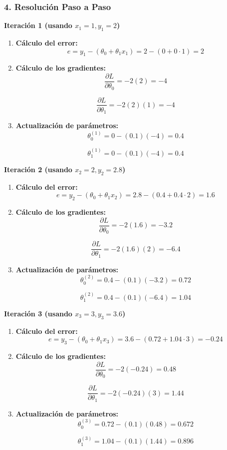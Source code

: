 \documentclass[a5paper]{article}
\begin{document}
	\subsubsection*{4. Resolución Paso a Paso}
	
	\textbf{Iteración 1 (usando \( x_1 = 1, y_1 = 2 \))}
	
	\begin{enumerate}
		\item \textbf{Cálculo del error:}
		\[
		e = y_1 - (\theta_0 + \theta_1 x_1) = 2 - (0 + 0 \cdot 1) = 2
		\]
		
		\item \textbf{Cálculo de los gradientes:}
		\[
		\frac{\partial L}{\partial \theta_0} = -2 (2) = -4
		\]
		
		\[
		\frac{\partial L}{\partial \theta_1} = -2 (2) (1) = -4
		\]
		
		\item \textbf{Actualización de parámetros:}
		\[
		\theta_0^{(1)} = 0 - (0.1)(-4) = 0.4
		\]
		
		\[
		\theta_1^{(1)} = 0 - (0.1)(-4) = 0.4
		\]
	\end{enumerate}
	
	\textbf{Iteración 2 (usando \( x_2 = 2, y_2 = 2.8 \))}
	
	\begin{enumerate}
		\item \textbf{Cálculo del error:}
		\[
		e = y_2 - (\theta_0 + \theta_1 x_2) = 2.8 - (0.4 + 0.4 \cdot 2) = 1.6
		\]
		
		\item \textbf{Cálculo de los gradientes:}
		\[
		\frac{\partial L}{\partial \theta_0} = -2(1.6) = -3.2
		\]
		
		\[
		\frac{\partial L}{\partial \theta_1} = -2(1.6) (2) = -6.4
		\]
		
		\item \textbf{Actualización de parámetros:}
		\[
		\theta_0^{(2)} = 0.4 - (0.1)(-3.2) = 0.72
		\]
		
		\[
		\theta_1^{(2)} = 0.4 - (0.1)(-6.4) = 1.04
		\]
	\end{enumerate}
	
	\textbf{Iteración 3 (usando \( x_3 = 3, y_3 = 3.6 \))}
	
	\begin{enumerate}
		\item \textbf{Cálculo del error:}
		\[
		e = y_3 - (\theta_0 + \theta_1 x_3) = 3.6 - (0.72 + 1.04 \cdot 3) = -0.24
		\]
		
		\item \textbf{Cálculo de los gradientes:}
		\[
		\frac{\partial L}{\partial \theta_0} = -2(-0.24) = 0.48
		\]
		
		\[
		\frac{\partial L}{\partial \theta_1} = -2(-0.24) (3) = 1.44
		\]
		
		\item \textbf{Actualización de parámetros:}
		\[
		\theta_0^{(3)} = 0.72 - (0.1)(0.48) = 0.672
		\]
		
		\[
		\theta_1^{(3)} = 1.04 - (0.1)(1.44) = 0.896
		\]
	\end{enumerate}
	
\end{document}
